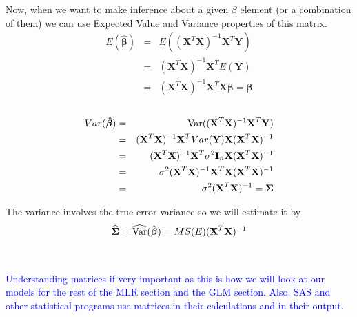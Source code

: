 Now, when we want to make inference about a given $\beta$ element (or a combination of them) we can use Expected Value and Variance properties of this matrix.
\begin{eqnarray*}
E(\boldsymbol{\hat{\beta}})& = &E((\textbf{X}^{T}\textbf{X})^{-1} \textbf{X}^{T}\textbf{Y})\\
&=&(\textbf{X}^{T}\textbf{X})^{-1} \textbf{X}^{T}E(\textbf{Y})\\
&= &(\textbf{X}^{T}\textbf{X})^{-1} \textbf{X}^{T}\textbf{X}\boldsymbol{\beta}=\boldsymbol{\beta}
\end{eqnarray*}
~\\
\begin{eqnarray*}
Var(\boldsymbol{\hat{\beta}})&=&\mbox{Var}((\textbf{X}^{T}\textbf{X})^{-1} \textbf{X}^{T}\textbf{Y})\\
&=&(\textbf{X}^{T}\textbf{X})^{-1} \textbf{X}^{T}Var(\textbf{Y})\textbf{X}(\textbf{X}^{T}\textbf{X})^{-1}\\
&=&(\textbf{X}^{T}\textbf{X})^{-1} \textbf{X}^{T}\sigma^2\textbf{I}_{n}\textbf{X}(\textbf{X}^{T}\textbf{X})^{-1}\\
&=&\sigma^2 (\textbf{X}^{T}\textbf{X})^{-1}\textbf{X}^{T}\textbf{X}(\textbf{X}^{T}\textbf{X})^{-1}\\
&=&\sigma^2(\textbf{X}^{T}\textbf{X})^{-1}=\boldsymbol{\Sigma}
\end{eqnarray*}

The variance involves the true error variance so we will estimate it by
$$\widehat{\boldsymbol{\Sigma}}=\widehat{\mbox{Var}}(\hat{\boldsymbol{\beta}})  =  MS(E)(\textbf{X}^{T}\textbf{X})^{-1}$$
~\\~\\

\textcolor{blue}{Understanding matrices if very important as this is how we will look at our models for the rest of the MLR section and the GLM section.  Also, SAS and other statistical programs use matrices in their calculations and in their output.}

\newpage

